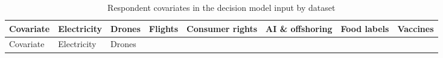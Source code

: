 \documentclass[
  11pt,
  letterpaper,
]{article}
\makeatletter
\newcommand\table@defaultsize{\footnotesize}
\let\table@size\table@defaultsize
\newcommand\nexttablesize[1]{\gdef\table@size{#1}}
\makeatother
\begin{document}
\nexttablesize{\footnotesize}
{\def\LTcaptype{apptbl}
\begin{longtable}[]{@{}
  >{\raggedright\arraybackslash}p{}
  >{\centering\arraybackslash}p{}
  >{\centering\arraybackslash}p{}
  >{\centering\arraybackslash}p{}
  >{\centering\arraybackslash}p{}
  >{\centering\arraybackslash}p{}
  >{\centering\arraybackslash}p{}
  >{\centering\arraybackslash}p{}@{}}
\caption{{\label{apptbl-covariates}}Respondent covariates in the
decision model input by dataset}\tabularnewline
\toprule\noalign{}
\begin{minipage}[b]{\linewidth}\raggedright
Covariate
\end{minipage} & \begin{minipage}[b]{\linewidth}\centering
Electricity
\end{minipage} & \begin{minipage}[b]{\linewidth}\centering
Drones
\end{minipage} & \begin{minipage}[b]{\linewidth}\centering
Flights
\end{minipage} & \begin{minipage}[b]{\linewidth}\centering
Consumer rights
\end{minipage} & \begin{minipage}[b]{\linewidth}\centering
AI \& offshoring
\end{minipage} & \begin{minipage}[b]{\linewidth}\centering
Food labels
\end{minipage} & \begin{minipage}[b]{\linewidth}\centering
Vaccines
\end{minipage} \\
\midrule\noalign{}
\endfirsthead
\toprule\noalign{}
\begin{minipage}[b]{\linewidth}\raggedright
Covariate
\end{minipage} & \begin{minipage}[b]{\linewidth}\centering
Electricity
\end{minipage} & \begin{minipage}[b]{\linewidth}\centering
Drones
\end{minipage} & \begin{minipage}[b]{\linewidth}\centering

\end{minipage}
\end{longtable}}
\end{document}
